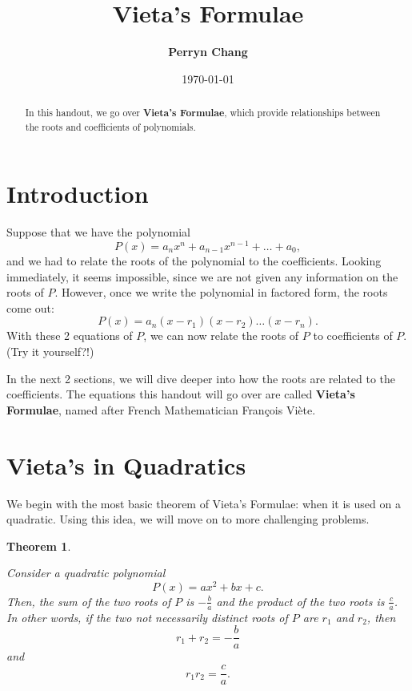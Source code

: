 \documentclass[l1pt]{article}
\title{\textbf{Vieta's Formulae}}
\author{\textbf{Perryn Chang}}
\date{\today}
\theoremstyle{plain}
\newtheorem{thm}{Theorem}[section]
\theoremstyle{definition}
\theoremstyle{remark}
\begin{document}
\maketitle

\begin{abstract}
In this handout, we go over \textbf{Vieta's Formulae}, which provide relationships between the roots and coefficients of polynomials.
\end{abstract}

\tableofcontents

\eject

\section{Introduction}

Suppose that we have the polynomial 
\[P(x)=a_nx^n+a_{n-1}x^{n-1}+\dots+a_0,\] and we had to relate the roots of the polynomial to the coefficients. Looking immediately, it seems impossible, since we are not given any information on the roots of $P$. However, once we write the polynomial in factored form, the roots come out: 
\[P(x)=a_n(x-r_1)(x-r_2)\dots(x-r_n).\] With these 2 equations of $P$, we can now relate the roots of $P$ to coefficients of $P$. (Try it yourself?!)

In the next 2 sections, we will dive deeper into how the roots are related to the coefficients. The equations this handout will go over are called \textbf{Vieta's Formulae}, named after French Mathematician Fran\c{c}ois Vi\`{e}te. 


\section{Vieta's in Quadratics}

We begin with the most basic theorem of Vieta's Formulae: when it is used on a quadratic. Using this idea, we will move on to more challenging problems.

\begin{thm}
\label{thm:easyquadratic}
\begin{mdframed}
Consider a quadratic polynomial \[P(x)=ax^2+bx+c.\] Then, the sum of the two roots of $P$ is $-\frac{b}{a}$ and the product of the two roots is $\frac{c}{a}$. In other words, if the two not necessarily distinct roots of $P$ are $r_1$ and $r_2$, then \[r_1+r_2=-\frac{b}{a}\] and \[r_1 r_2=\frac{c}{a}.\]
\end{mdframed}
\end{thm}
\end{document}
